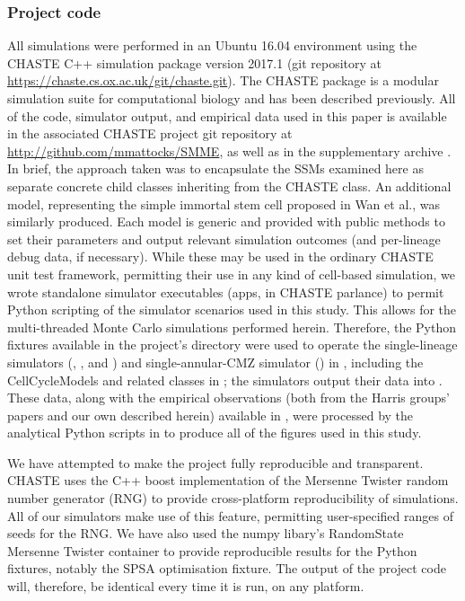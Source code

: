 \subsubsection{Project code}
All simulations were performed in an Ubuntu 16.04 environment using the CHASTE C++ simulation package version 2017.1 (git repository at \url{https://chaste.cs.ox.ac.uk/git/chaste.git}). The CHASTE package is a modular simulation suite for computational biology and has been described previously\cite{Mirams2013}. All of the code, simulator output, and empirical data used in this paper is available in the associated CHASTE project git repository at \url{http://github.com/mmattocks/SMME}, as well as in the supplementary archive . In brief, the approach taken was to encapsulate the SSMs examined here as separate concrete child classes inheriting from the CHASTE  class. An additional model, representing the simple immortal stem cell proposed in Wan et al.\cite{Wan2016}, was similarly produced. Each model is generic and provided with public methods to set their parameters and output relevant simulation outcomes (and per-lineage debug data, if necessary). While these may be used in the ordinary CHASTE unit test framework, permitting their use in any kind of cell-based simulation, we wrote standalone simulator executables (apps, in CHASTE parlance) to permit Python scripting of the simulator scenarios used in this study. This allows for the multi-threaded Monte Carlo simulations performed herein. Therefore, the Python fixtures available in the project's  directory were used to operate the single-lineage simulators (, , and ) and single-annular-CMZ simulator () in , including the CellCycleModels and related classes in ; the simulators output their data into . These data, along with the empirical observations (both from the Harris groups' papers and our own described herein) available in , were processed by the analytical Python scripts in  to produce all of the figures used in this study.

We have attempted to make the project fully reproducible and transparent. CHASTE uses the C++ boost implementation of the Mersenne Twister random number generator (RNG) to provide cross-platform reproducibility of simulations. All of our simulators make use of this feature, permitting user-specified ranges of seeds for the RNG. We have also used the numpy libary's RandomState Mersenne Twister container to provide reproducible results for the Python fixtures, notably the SPSA optimisation fixture. The output of the project code will, therefore, be identical every time it is run, on any platform.

